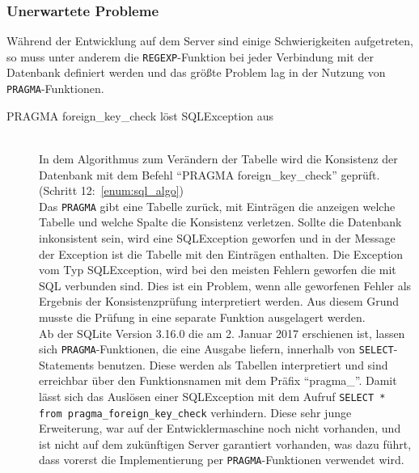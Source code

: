 \subsubsection{Unerwartete Probleme}
\label{subsubsec04:server_problems}

Während der Entwicklung auf dem Server sind einige Schwierigkeiten aufgetreten, so muss unter anderem die \texttt{REGEXP}-Funktion bei jeder Verbindung mit der Datenbank definiert werden und das größte Problem lag in der Nutzung von \texttt{PRAGMA}-Funktionen.

\begin{description}
\item[PRAGMA foreign\_key\_check löst SQLException aus] \hfill\\
In dem Algorithmus zum Verändern der Tabelle wird die Konsistenz der Datenbank mit dem Befehl ``PRAGMA foreign\_key\_check'' geprüft. (Schritt 12:~\ref{enum:sql_algo}) \\
Das \texttt{PRAGMA} gibt eine Tabelle zurück, mit Einträgen die anzeigen welche Tabelle und welche Spalte die Konsistenz verletzen. 
Sollte die Datenbank inkonsistent sein, wird eine SQLException geworfen und in der Message der Exception ist die Tabelle mit den Einträgen enthalten. Die Exception vom Typ SQLException, wird bei den meisten Fehlern geworfen die mit SQL verbunden sind. Dies ist ein Problem, wenn alle geworfenen Fehler als Ergebnis der Konsistenzprüfung interpretiert werden. Aus diesem Grund musste die Prüfung in eine separate Funktion ausgelagert werden. \\
Ab der SQLite Version 3.16.0 die am 2. Januar 2017 erschienen ist, lassen sich \texttt{PRAGMA}-Funktionen, die eine Ausgabe liefern, innerhalb von \texttt{SELECT}-Statements benutzen. Diese werden als Tabellen interpretiert und sind erreichbar über den Funktionsnamen mit dem Präfix ``pragma\_''. Damit lässt sich das Auslösen einer SQLException mit dem Aufruf \texttt{SELECT * from pragma\_foreign\_key\_check} verhindern. Diese sehr junge Erweiterung, war auf der Entwicklermaschine noch nicht vorhanden, und ist nicht auf dem zukünftigen Server garantiert vorhanden, was dazu führt, dass vorerst die Implementierung per \texttt{PRAGMA}-Funktionen verwendet wird.
\end{description}
